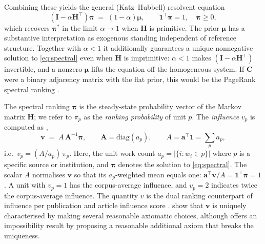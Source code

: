 Combining these yields the general (Katz--Hubbell) resolvent equation
\begin{equation}
	(\mathbf{I} - \alpha\mathbf{H}^\top)\boldsymbol{\pi}
	\;=\;
	(1-\alpha)\boldsymbol{\mu},
	\qquad
	\mathbf{1}^\top\boldsymbol{\pi}=1,
	\quad
	\boldsymbol{\pi}\ge 0,
	\label{eq:spectral}
\end{equation}
which recovers $\boldsymbol{\pi}^*$ in the limit $\alpha\to 1$ when
$\mathbf{H}$ is primitive.
The prior $\boldsymbol{\mu}$ has a substantive interpretation as exogenous standing independent of reference structure. Together with $\alpha<1$ it additionally guarantees a unique nonnegative solution to \eqref{eq:spectral} even when $\mathbf{H}$ is imprimitive: $\alpha<1$ makes $(\mathbf{I}-\alpha\mathbf{H}^\top)$ invertible, and a nonzero $\boldsymbol{\mu}$ lifts the equation off the homogeneous system. If $\mathbf{C}$ were a binary adjacency matrix with the flat prior, this would be the PageRank spectral ranking \citep{brinAnatomyLargeScaleHypertextual1998}.

The spectral ranking $\boldsymbol{\pi}$ is the steady-state probability vector of the Markov matrix $\mathbf{H}$; we refer to $\pi_p$ as the \emph{ranking probability} of unit $p$.
The \emph{influence} $v_p$ is computed as \citep{palacios-huertaMeasurementIntellectualInfluence2004},
\begin{equation}
	\mathbf{v}
	\;=\;
	A\,\mathbf{A}^{-1}\boldsymbol{\pi},
	\qquad
	\mathbf{A}=\mathrm{diag}(a_p),
	\qquad
	A = \mathbf{a}^{\top}\mathbf{1} = \textstyle\sum_p a_p,
	\label{eq:vstar}
\end{equation}
i.e.\ $v_p = (A/a_p)\,\pi_p$. 
Here, the unit work count $a_p = |\{i:w_i\in p\}|$ where $p$ is a specific source or institution,
and $\boldsymbol{\pi}$ denotes the solution to \eqref{eq:spectral}.
The scalar $A$ normalises $\mathbf{v}$ so that its $a_p$-weighted mean equals one:
$\mathbf{a}^{\top}\mathbf{v}/A=\mathbf{1}^{\top}\boldsymbol{\pi}=1$.
A unit with $v_p=1$ has the corpus-average influence, and
$v_p=2$ indicates twice the corpus-average influence.  The quantity $v$ is the dual ranking counterpart of influence per publication \citep{pinski} and article influence score \cite{bergstromEigenfactorMetricsFigure2008}.
\cite{palacios-huertaMeasurementIntellectualInfluence2004} show that
$\mathbf{v}$ is uniquely characterised by making several reasonable axiomatic
choices, although \cite{serranoMeasurementIntellectualInfluence2004} offers an impossibility result by proposing a reasonable additional axiom that breaks the uniqueness.

